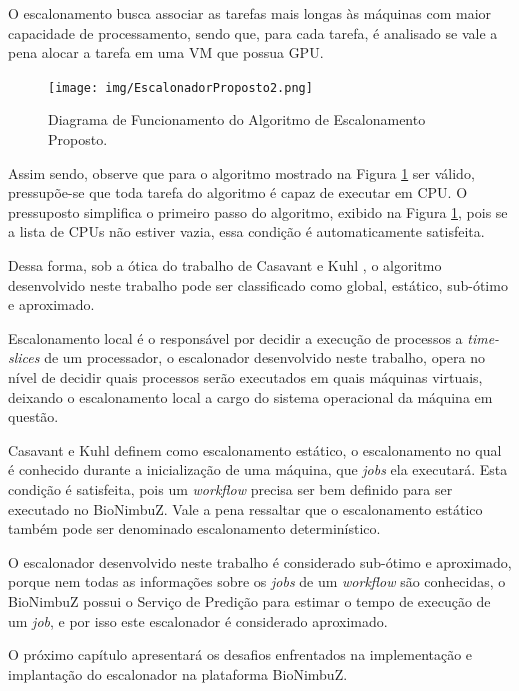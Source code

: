 O escalonamento busca associar as tarefas mais longas às máquinas com maior capacidade de processamento, sendo que, para cada tarefa, é analisado se vale a pena alocar a tarefa em uma \acrshort{VM} que possua \acrshort{GPU}.


\begin{figure}[htbp]
	\centerline{\texttt{[image: img/EscalonadorProposto2.png]}}
	\caption{Diagrama de Funcionamento do Algoritmo de Escalonamento Proposto.}
	\label{Escalonamento}
\end{figure}


Assim sendo, observe que para o algoritmo mostrado na Figura \ref{Escalonamento} ser válido, pressupõe-se que toda tarefa do algoritmo é capaz de executar em \acrshort{CPU}. O pressuposto simplifica o primeiro passo do algoritmo, exibido na Figura \ref{Escalonamento}, pois se a lista de \acrshort{CPU}s não estiver vazia, essa condição é automaticamente satisfeita.

Dessa forma, sob a ótica do trabalho de Casavant e Kuhl \cite{4634_TaxonomiaEscalonador}, o algoritmo desenvolvido neste trabalho pode ser classificado como global, estático, sub-ótimo e aproximado.%

Escalonamento local é o responsável por decidir a execução de processos a \textit{time-slices} de um processador, o escalonador desenvolvido neste trabalho, opera no nível de decidir quais processos serão executados em quais máquinas virtuais, deixando o escalonamento local a cargo do sistema operacional da máquina em questão.

Casavant e Kuhl \cite{4634_TaxonomiaEscalonador} definem como escalonamento estático, o escalonamento no qual é conhecido durante a inicialização de uma máquina, que \textit{jobs} ela executará. Esta condição é satisfeita, pois um \textit{workflow} precisa ser bem definido para ser executado no BioNimbuZ. Vale a pena ressaltar que o escalonamento estático também pode ser denominado escalonamento determinístico.

O escalonador desenvolvido neste trabalho é considerado sub-ótimo e aproximado, porque nem todas as informações sobre os \textit{jobs} de um \textit{workflow} são conhecidas, o BioNimbuZ possui o Serviço de Predição para estimar o tempo de execução de um \textit{job}, e por isso este escalonador é considerado aproximado.


O próximo capítulo apresentará os desafios enfrentados na implementação e implantação do escalonador na plataforma BioNimbuZ.




